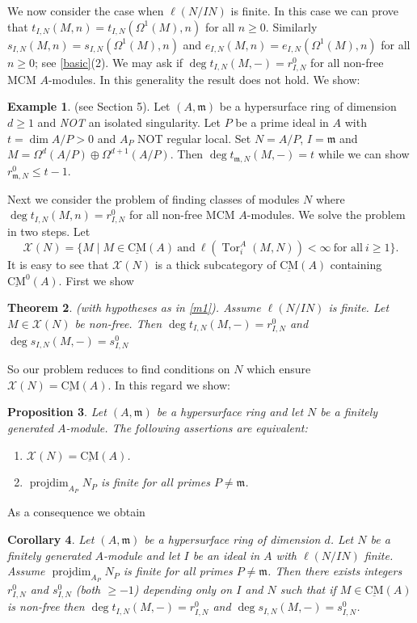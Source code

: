 \documentclass{amsart}
\newcommand{\m}{\mathfrak{m} }
\newcommand{\X}{\mathcal{X} }
\newcommand{\projdim}{\operatorname{projdim}}
\newcommand{\Tor}{\operatorname{Tor}}
\newcommand{\CMS}{\operatorname{\underline{CM}}}
\theoremstyle{plain}
\newtheorem{theorem}{Theorem}[section]
\newtheorem{corollary}[theorem]{Corollary}
\newtheorem{proposition}[theorem]{Proposition}
\theoremstyle{definition}
\newtheorem{example}[theorem]{Example}
\theoremstyle{remark}
\begin{document}
\s We now consider the case when $\ell(N/IN)$ is finite. In this case we can prove that $t_{I, N}(M, n) = t_{I, N}(\Omega^1(M), n)$ for all $n \geq 0$. Similarly $s_{I, N}(M, n) = s_{I, N}(\Omega^1(M), n)$ and
$e_{I, N}(M, n) = e_{I, N}(\Omega^1(M), n)$ for all $n \geq 0$; see \ref{basic}(2). We may ask if $\deg t_{I, N}(M, -) = r_{I, N}^0$ for all non-free MCM $A$-modules. In this generality the result does not hold. We show:
\begin{example}\label{ex}(see Section 5).
Let $(A, \m)$ be a hypersurface ring of dimension $d \geq 1$ and \emph{NOT} an isolated singularity. Let $P$ be a prime ideal in $A$ with $t = \dim A/P > 0$ and $A_P$ NOT regular local.
Set $N = A/P$, $I = \m$ and $M = \Omega^{d}(A/P) \oplus \Omega^{d+1}(A/P)$. Then $\deg t_{\m, N}(M, -) = t$ while we can show $r_{\m, N}^0 \leq t -1$.
\end{example}
Next we consider the problem of finding  classes of modules $N$ where \\ $\deg t_{I, N}(M, n) = r_{I, N}^0$ for all non-free MCM $A$-modules.  We solve the problem in two steps.
Let
$$\X(N)  = \{ M \mid M \in \CMS(A) \ \text{and} \ \ell(\Tor^A_i(M, N)) < \infty \ \text{for all}\ i \geq 1 \}.$$
It is easy to see that $\X(N)$ is a thick subcategory of $\CMS(A)$ containing $\CMS^0(A)$. First we show
\begin{theorem}\label{xi}
(with hypotheses as in \ref{m1}). Assume $\ell(N/IN)$ is finite. Let $M \in \X(N)$ be non-free. Then $\deg t_{I, N}(M,-) = r_{I, N}^0$ and $\deg s_{I, N}(M,-) = s_{I, N}^0$
\end{theorem}
So our problem reduces to find conditions on $N$ which ensure $\X(N) = \CMS(A)$. In this regard we show:
\begin{proposition}\label{XNmax}
Let $(A, \m)$ be a hypersurface ring and let $N$ be a finitely generated $A$-module. The following assertions are equivalent:
\begin{enumerate}[\rm (1)]
  \item $\X(N) = \CMS(A)$.
  \item $\projdim_{A_P} N_P$ is finite for all primes $P \neq \m$.
\end{enumerate}
\end{proposition}
As a consequence we obtain
\begin{corollary}
  \label{m1-gen}
Let $(A,\m)$ be a hypersurface ring of dimension $d$. Let $N$ be a finitely generated $A$-module and let $I$ be an ideal in $A$ with $\ell(N/IN)$ finite. Assume $\projdim_{A_P} N_P$ is finite for all primes $P \neq \m$. Then
 there exists integers $r_{I, N}^0$ and $s_{I, N}^0$ (both $\geq -1$) depending only on $I$ and $N$ such that if $M \in \CMS(A)$ is  non-free then
$\deg t_{I,N}(M, -) = r_{I, N}^0$ and $\deg s_{I,N}(M, -) = s_{I, N}^0$.
\end{corollary}
\end{document}
